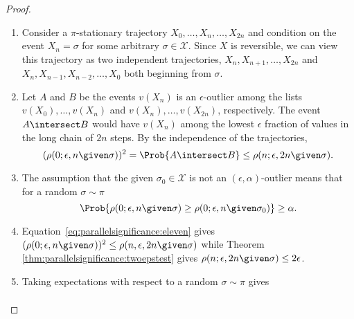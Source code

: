 \documentclass[12pt]{article}
\begin{document}
\begin{proof}
    \begin{enumerate}
        \item
            Consider a \( \pi \)-stationary trajectory \( X_0, \dots, X_n,
            \dots, X_{2n} \) and condition on the event \( X_n = \sigma \)
            for some arbitrary \( \sigma \in \mathcal{X} \).  Since \( X
            \) is reversible, we can view this trajectory as two
            independent trajectories, \( X_n, X_{n+1}, \dots, X_{2n} \)
            and \( X_n, X_{n-1}, X_ {n-2}, \dots, X_0 \) both beginning
            from \( \sigma \).
        \item
            Let \( A \) and \( B \) be the events \( v(X_n) \) is an \(
            \epsilon \)-outlier among the lists \( v(X_0), \dots, v(X_n)
            \) and \( v(X_n), \dots, v(X_{2n}) \), respectively.  The
            event \( A \intersect B \) would have \( v(X_n) \) among the
            lowest \( \epsilon \) fraction of values in the long chain
            of \( 2n \) steps.  By the independence of the trajectories,
            \begin{equation}
                \label{eq:parallelsignificance:eleven} (\rho(0; \epsilon,
                n \given \sigma))^2 = \Prob{ A \intersect B} \le \rho(n;
                \epsilon, 2n \given \sigma).
            \end{equation}
        \item
            The assumption that the given \( \sigma_0 \in \mathcal{X} \)
            is not an \( (\epsilon, \alpha) \)-outlier means that for a
            random \( \sigma \sim \pi \)
            \begin{equation}
                \label{eq:parallelsignificance:twelve} \Prob{ \rho(0;
                \epsilon, n \given \sigma) \ge \rho(0; \epsilon, n
                \given \sigma_0) } \ge \alpha.
            \end{equation}
        \item
            Equation~\eqref{eq:parallelsignificance:eleven} gives \( (\rho
            (0; \epsilon, n \given \sigma))^2 \le \rho(n, \epsilon, 2n
            \given \sigma) \) while Theorem~%
            \ref{thm:parallelsignificance:twoepstest} gives \( \rho(n;
            \epsilon, 2n \given \sigma) \le 2\epsilon \).
        \item
            Taking expectations with respect to a random \( \sigma \sim
            \pi \) gives
            \begin{align*}

\end{align*}
\end{enumerate}
\end{proof}
\end{document}
